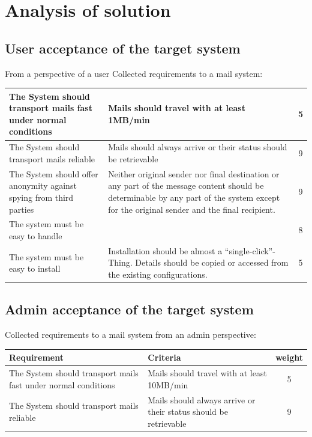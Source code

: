 \documentclass[11pt,a4paper]{book}
\begin{document}
\chapter{Analysis of solution}
\section{User acceptance of the target system}
From a perspective of a user 
Collected requirements to a mail system:\par
\begin{center}
\tablelasttail{\hline}
\begin{supertabular}{|p{5cm}|p{5cm}|c|}\hline
The System should transport mails fast under normal conditions & Mails should travel with at least 1MB/min & 5\\\hline
The System should transport mails reliable & Mails should always arrive or their status should be retrievable & 9\\\hline
The System should offer anonymity against spying from third parties & Neither original sender nor final destination or any part of the message content should be determinable by any part of the system except for the original sender and the final recipient.& 9\\\hline
The system must be easy to handle &&8\\\hline
The system must be easy to install & Installation should be almost a ``single-click''-Thing. Details should be copied or accessed from the existing configurations.&5\\\hline
\end{supertabular}
\end{center}

\section{Admin acceptance of the target system}
Collected requirements to a mail system from an admin perspective:\par
\begin{tabular}{|p{5cm}|p{5cm}|c|}\hline
Requirement& Criteria& weight\\\hline
The System should transport mails fast under normal conditions & Mails should travel with at least 10MB/min & 5\\
The System should transport mails reliable & Mails should always arrive or their status should be retrievable & 9\\
\hline\end{tabular}
\end{document}

